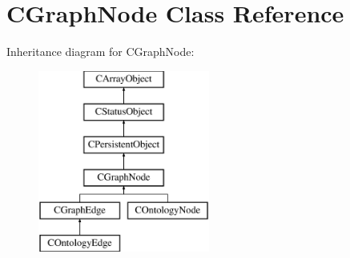 \hypertarget{class_c_graph_node}{\section{C\-Graph\-Node Class Reference}
\label{class_c_graph_node}
}
Inheritance diagram for C\-Graph\-Node\-:\begin{figure}[H]
\begin{center}
\leavevmode
\includegraphics[height=6.000000cm]{class_c_graph_node}
\end{center}
\end{figure}
